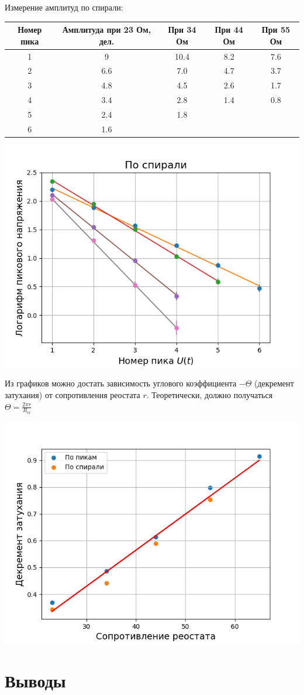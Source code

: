 \documentclass[a4paper, 12pt]{article}
\begin{document}
Измерение амплитуд по спирали:

\begin{tabular}{|c|c|c|c|c|}
\hline
Номер пика & Амплитуда при 23 Ом, дел. & При 34 Ом & При 44 Ом & При 55 Ом \\ \hline
1 & 9    & 10.4 & 8.2 & 7.6  \\ \hline
2 & 6.6  & 7.0  & 4.7 & 3.7  \\ \hline
3 & 4.8  & 4.5  & 2.6 & 1.7  \\ \hline
4 & 3.4  & 2.8  & 1.4 & 0.8  \\ \hline
5 & 2.4  & 1.8  &     &      \\ \hline       
6 & 1.6  &      &     &      \\ \hline      
\end{tabular}
\begin{center}
\includegraphics[width=0.7\linewidth]{qfactor_peaks_spiral.png}
\end{center}

Из графиков можно достать зависимость углового коэффициента $-\Theta$ (декремент затухания) от сопротивления реостата $r$.
Теоретически, должно получаться $\Theta = \frac{2 \pi r}{R_{\text{cr}}}$
\begin{center}
\includegraphics[width=0.7\linewidth]{qfactor_prop_r.png}
\end{center}

\section{Выводы}
\end{document}
